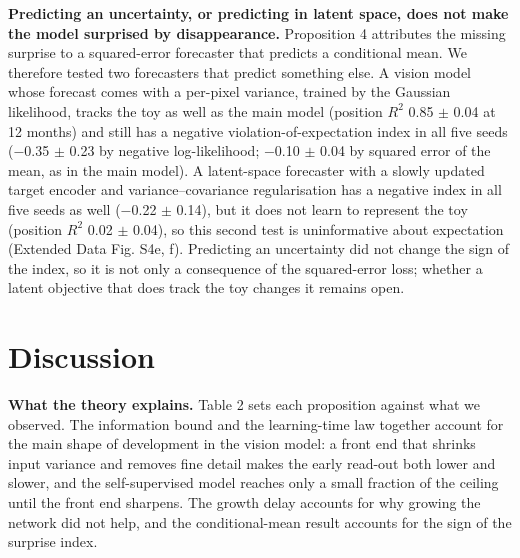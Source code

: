 \documentclass{article}
\begin{document}
\textbf{Predicting an uncertainty, or predicting in latent space, does not make the model surprised by disappearance.} Proposition 4 attributes the missing surprise to a squared-error forecaster that predicts a conditional mean. We therefore tested two forecasters that predict something else. A vision model whose forecast comes with a per-pixel variance, trained by the Gaussian likelihood, tracks the toy as well as the main model (position \(R^2\) 0.85 \ensuremath{\pm} 0.04 at 12 months) and still has a negative violation-of-expectation index in all five seeds ($-$0.35 \ensuremath{\pm} 0.23 by negative log-likelihood; $-$0.10 \ensuremath{\pm} 0.04 by squared error of the mean, as in the main model). A latent-space forecaster with a slowly updated target encoder and variance--covariance regularisation has a negative index in all five seeds as well ($-$0.22 \ensuremath{\pm} 0.14), but it does not learn to represent the toy (position \(R^2\) 0.02 \ensuremath{\pm} 0.04), so this second test is uninformative about expectation (Extended Data Fig. S4e, f). Predicting an uncertainty did not change the sign of the index, so it is not only a consequence of the squared-error loss; whether a latent objective that does track the toy changes it remains open.

\section{Discussion}

\textbf{What the theory explains.} Table 2 sets each proposition against what we observed. The information bound and the learning-time law together account for the main shape of development in the vision model: a front end that shrinks input variance and removes fine detail makes the early read-out both lower and slower, and the self-supervised model reaches only a small fraction of the ceiling until the front end sharpens. The growth delay accounts for why growing the network did not help, and the conditional-mean result accounts for the sign of the surprise index.
\end{document}

